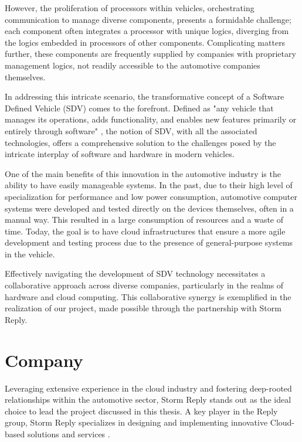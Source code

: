However, the proliferation of processors within vehicles, orchestrating communication to manage diverse components, presents a formidable challenge; each component often integrates a processor with unique logics, diverging from the logics embedded in processors of other components. Complicating matters further, these components are frequently supplied by companies with proprietary management logics, not readily accessible to the automotive companies themselves.

In addressing this intricate scenario, the transformative concept of a Software Defined Vehicle (SDV) comes to the forefront. Defined as "any vehicle that manages its operations, adds functionality, and enables new features primarily or entirely through software"  \cite{blackberrySDV}, the notion of SDV, with all the associated technologies, offers a comprehensive solution to the challenges posed by the intricate interplay of software and hardware in modern vehicles.

One of the main benefits of this innovation in the automotive industry is the ability to have easily manageable systems. In the past, due to their high level of specialization for performance and low power consumption, automotive computer systems were developed and tested directly on the devices themselves, often in a manual way. This resulted in a large consumption of resources and a waste of time. Today, the goal is to have cloud infrastructures that ensure a more agile development and testing process due to the presence of general-purpose systems in the vehicle.

Effectively navigating the development of SDV technology necessitates a collaborative approach across diverse companies, particularly in the realms of hardware and cloud computing. This collaborative synergy is exemplified in the realization of our project, made possible through the partnership with Storm Reply.


\section{Company}

Leveraging extensive experience in the cloud industry and fostering deep-rooted relationships within the automotive sector, Storm Reply stands out as the ideal choice to lead the project discussed in this thesis. A key player in the Reply group, Storm Reply specializes in designing and implementing innovative Cloud-based solutions and services \cite{StormReplySite}. 

